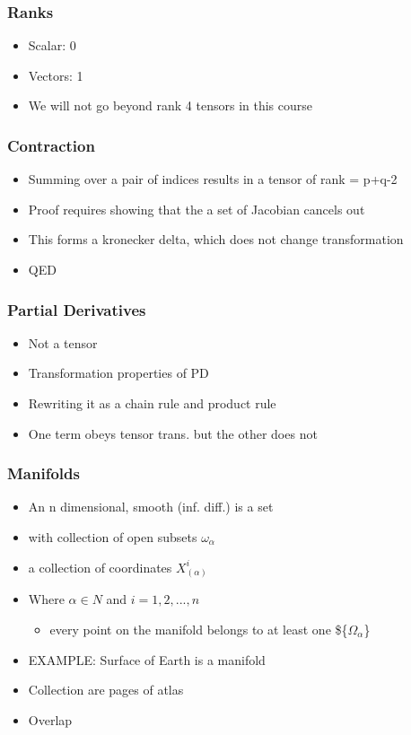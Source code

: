 \documentclass[11pt]{article}
\begin{document}
\subsubsection{Ranks}
\label{sec:orgba3cfe7}
\begin{itemize}
\item Scalar: 0
\item Vectors: 1
\item We will not go beyond rank 4 tensors in this course
\end{itemize}
\subsubsection{Contraction}
\label{sec:orgea361d6}
\begin{itemize}
\item Summing over a pair of indices results in a tensor of rank = p+q-2
\item Proof requires showing that the a set of Jacobian cancels out
\item This forms a kronecker delta, which does not change transformation
\item QED
\end{itemize}
\subsubsection{Partial Derivatives}
\label{sec:orgdfb5430}
\begin{itemize}
\item Not a tensor
\item Transformation properties of PD
\item Rewriting it as a chain rule and product rule
\item One term obeys tensor trans. but the other does not
\end{itemize}
\subsubsection{Manifolds}
\label{sec:org88d1bd0}
\begin{itemize}
\item An n dimensional, smooth (inf. diff.) is a set
\item with collection of open subsets \({\omega_\alpha}\)
\item a collection of coordinates \({X^i_{(\alpha)}}\)
\item Where \(\alpha \in N\) and \(i = 1,2,...,n\)
\begin{itemize}
\item every point on the manifold belongs to at least one \$\{\(\Omega_{\alpha}\)\}
\end{itemize}
\item EXAMPLE: Surface of Earth is a manifold
\item Collection are pages of atlas
\item Overlap
\end{itemize}
\end{document}
